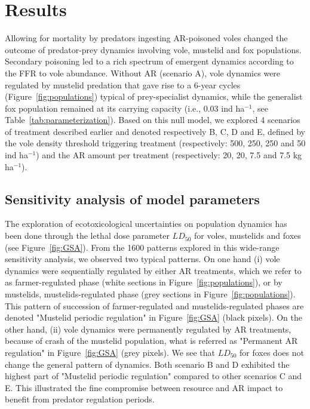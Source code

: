 \documentclass[11pt]{article}
\begin{document}
\section{Results}

Allowing for mortality by predators ingesting AR-poisoned voles changed the outcome of predator-prey dynamics involving vole, mustelid and fox populations. Secondary poisoning led to a rich spectrum of emergent dynamics according to the FFR to vole abundance.  
Without AR (scenario A), vole dynamics were regulated by mustelid predation that gave rise to a 6-year cycles (Figure~\ref{fig:populations}) typical of prey-specialist dynamics, while the generalist fox population remained at its carrying capacity (i.e., 0.03 ind ha$^{-1}$, see Table~\ref{tab:parameterization}).  
%
Based on this null model, we explored 4 scenarios of treatment described earlier and denoted respectively B, C, D and E, defined by the vole density threshold triggering treatment (respectively: 500, 250, 250 and 50 ind ha$^{-1}$) and the AR amount per treatment (respectively: 20, 20, 7.5 and 7.5 kg ha$^{-1}$).


\subsection{Sensitivity analysis of model parameters}

The exploration of ecotoxicological uncertainties on population dynamics has been done through the lethal dose parameter $LD_{50}$ for voles, mustelids and foxes (see Figure~\ref{fig:GSA}).
%
From the 1600 patterns explored in this wide-range sensitivity analysis, we observed two typical patterns. On one hand (i) vole dynamics were sequentially regulated by either AR treatments, which we refer to as farmer-regulated phase (white sections in Figure~\ref{fig:populations}), or by mustelids, mustelids-regulated phase (grey sections in Figure~\ref{fig:populations}). This pattern of succession of farmer-regulated and mustelids-regulated phases are denoted "Mustelid periodic regulation" in Figure~\ref{fig:GSA} (black pixels). On the other hand, (ii) vole dynamics were permanently regulated by AR treatments, because of crash of the mustelid population, what is referred as "Permanent AR regulation" in Figure~\ref{fig:GSA} (grey pixels).
%
We see that  $LD_{50}$ for foxes does not change the general pattern of dynamics.
Both scenario B and D exhibited the highest part of "Mustelid periodic regulation" compared to other scenarios C and E. This illustrated the fine compromise between resource and AR impact to benefit from predator regulation periods.
\end{document}
